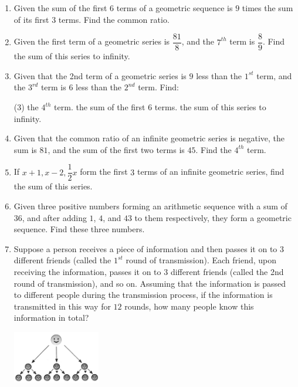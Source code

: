 \documentclass{report}
\begin{document}
\begin{enumerate}
            \item Given the sum of the first $6$ terms of a geometric sequence is $9$ times the sum of its first $3$ terms. Find the common ratio.

            \item Given the first term of a geometric series is $\dfrac{81}{8}$, and the $7^{th}$ term is $\dfrac{8}{9}$. Find the sum of this series to infinity.

            \item Given that the 2nd term of a geometric series is $9$ less than the $1^{st}$ term, and the $3^{rd}$ term is $6$ less than the $2^{nd}$ term. Find:
            \begin{tasks}[label=(\alph*)](3)
                \task the $4^{th}$ term.
                \task the sum of the first $6$ terms.
                \task the sum of this series to infinity.
            \end{tasks}

            \item Given that the common ratio of an infinite geometric series is negative, the sum is $81$, and the sum of the first two terms is $45$. Find the $4^{th}$ term.

            \item If $x+1, x-2, \dfrac{1}{2}x$ form the first $3$ terms of an infinite geometric series, find the sum of this series.
            
            \item Given three positive numbers forming an arithmetic sequence with a sum of $36$, and after adding $1$, $4$, and $43$ to them respectively, they form a geometric sequence. Find these three numbers.
            
            \item \begin{multicols}{2}
                Suppose a person receives a piece of information and then passes it on to $3$ different friends (called the $1^{st}$ round of transmission). Each friend, upon receiving the information, passes it on to $3$ different friends (called the 2nd round of transmission), and so on. Assuming that the information is passed to different people during the transmission process, if the information is transmitted in this way for $12$ rounds, how many people know this information in total?
                \columnbreak

                \begin{center}
                    \vspace*{1em}
                    \includegraphics[width=0.3\textwidth]{assets/13-10.jpg}
                \end{center}
            \end{multicols}
            

\end{enumerate}
\end{document}
